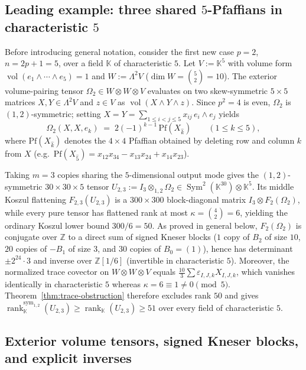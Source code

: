 \documentclass[11pt,reqno]{amsart}
\theoremstyle{definition}
\theoremstyle{remark}
\numberwithin{equation}{section}
\newcommand{\KK}{\mathbb{K}}
\newcommand{\ZZ}{\mathbb{Z}}
\DeclareMathOperator{\rk}{rank}
\DeclareMathOperator{\Sym}{Sym}
\DeclareMathOperator{\vol}{vol}
\begin{document}
\subsection{Leading example: three shared \texorpdfstring{$5$}{5}-Pfaffians in characteristic \texorpdfstring{$5$}{5}}

Before introducing general notation, consider the first new case $p = 2$, $n = 2p + 1 = 5$, over a field $\KK$ of characteristic $5$. Let $V := \KK^5$ with volume form $\vol(e_1 \wedge \cdots \wedge e_5) = 1$ and $W := \Lambda^2 V$ ($\dim W = \binom{5}{2} = 10$). The exterior volume-pairing tensor $\Omega_2 \in W \otimes W \otimes V$ evaluates on two skew-symmetric $5 \times 5$ matrices $X, Y \in \Lambda^2 V$ and $z \in V$ as $\vol(X \wedge Y \wedge z)$. Since $p^2 = 4$ is even, $\Omega_2$ is $(1,2)$-symmetric; setting $X = Y = \sum_{1 \le i < j \le 5} x_{ij}\, e_i \wedge e_j$ yields
\[
  \Omega_2(X, X, e_k) \;=\; 2(-1)^{k-1}\,\mathrm{Pf}(X_{\widehat{k}}) \qquad (1 \le k \le 5),
\]
where $\mathrm{Pf}(X_{\widehat{k}})$ denotes the $4 \times 4$ Pfaffian obtained by deleting row and column $k$ from $X$ (e.g.\ $\mathrm{Pf}(X_{\widehat{5}}) = x_{12} x_{34} - x_{13} x_{24} + x_{14} x_{23}$).

Taking $m = 3$ copies sharing the $5$-dimensional output mode gives the $(1,2)$-symmetric $30 \times 30 \times 5$ tensor $U_{2,3} := I_3 \otimes_{1,2} \Omega_2 \in \Sym^2(\KK^{30}) \otimes \KK^5$. Its middle Koszul flattening $F_{2,3}(U_{2,3})$ is a $300 \times 300$ block-diagonal matrix $I_3 \otimes F_2(\Omega_2)$, while every pure tensor has flattened rank at most $\kappa = \binom{4}{2} = 6$, yielding the ordinary Koszul lower bound $300/6 = 50$. As proved in general below, $F_2(\Omega_2)$ is conjugate over $\ZZ$ to a direct sum of signed Kneser blocks ($1$ copy of $B_2$ of size $10$, $20$ copies of $-B_1$ of size $3$, and $30$ copies of $B_0 = (1)$), hence has determinant $\pm 2^{24}\cdot 3$ and inverse over $\ZZ[1/6]$ (invertible in characteristic $5$). Moreover, the normalized trace covector on $W \otimes W \otimes V$ equals $\frac{10}{3} \sum \varepsilon_{I,J,k} X_{I,J,k}$, which vanishes identically in characteristic $5$ whereas $\kappa = 6 \equiv 1 \neq 0 \pmod 5$. Theorem~\ref{thm:trace-obstruction} therefore excludes rank $50$ and gives $\rk_{\KK}^{\mathrm{sym}_{1,2}}(U_{2,3}) \ge \rk_{\KK}(U_{2,3}) \ge 51$ over every field of characteristic $5$.

\subsection{Exterior volume tensors, signed Kneser blocks, and explicit inverses}
\end{document}
